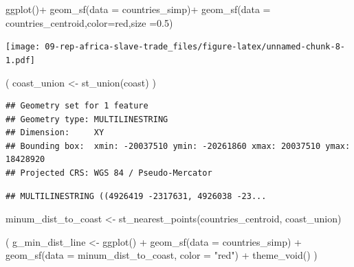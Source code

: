 \documentclass[
  oneside]{book}
\newenvironment{Shaded}{\begin{snugshade}}{\end{snugshade}}
\newcommand{\AttributeTok}[1]{\textcolor[rgb]{0.77,0.63,0.00}{#1}}
\newcommand{\FloatTok}[1]{\textcolor[rgb]{0.00,0.00,0.81}{#1}}
\newcommand{\FunctionTok}[1]{\textcolor[rgb]{0.00,0.00,0.00}{#1}}
\newcommand{\NormalTok}[1]{#1}
\newcommand{\OtherTok}[1]{\textcolor[rgb]{0.56,0.35,0.01}{#1}}
\newcommand{\SpecialCharTok}[1]{\textcolor[rgb]{0.00,0.00,0.00}{#1}}
\newcommand{\StringTok}[1]{\textcolor[rgb]{0.31,0.60,0.02}{#1}}
\begin{document}
\begin{Shaded}
\begin{Highlighting}[]
\FunctionTok{ggplot}\NormalTok{()}\SpecialCharTok{+}
  \FunctionTok{geom\_sf}\NormalTok{(}\AttributeTok{data =}\NormalTok{ countries\_simp)}\SpecialCharTok{+}
  \FunctionTok{geom\_sf}\NormalTok{(}\AttributeTok{data =}\NormalTok{ countries\_centroid,}\AttributeTok{color=}\StringTok{\textquotesingle{}red\textquotesingle{}}\NormalTok{,}\AttributeTok{size =}\FloatTok{0.5}\NormalTok{)}
\end{Highlighting}
\end{Shaded}

\texttt{[image: 09-rep-africa-slave-trade\_files/figure-latex/unnamed-chunk-8-1.pdf]}

\begin{Shaded}
\begin{Highlighting}[]
\NormalTok{(}
\NormalTok{  coast\_union }\OtherTok{\textless{}{-}} \FunctionTok{st\_union}\NormalTok{(coast)}
\NormalTok{)}
\end{Highlighting}
\end{Shaded}

\begin{verbatim}
## Geometry set for 1 feature 
## Geometry type: MULTILINESTRING
## Dimension:     XY
## Bounding box:  xmin: -20037510 ymin: -20261860 xmax: 20037510 ymax: 18428920
## Projected CRS: WGS 84 / Pseudo-Mercator
\end{verbatim}

\begin{verbatim}
## MULTILINESTRING ((4926419 -2317631, 4926038 -23...
\end{verbatim}

\begin{Shaded}
\begin{Highlighting}[]
\NormalTok{minum\_dist\_to\_coast }\OtherTok{\textless{}{-}} \FunctionTok{st\_nearest\_points}\NormalTok{(countries\_centroid, coast\_union)}
\end{Highlighting}
\end{Shaded}

\begin{Shaded}
\begin{Highlighting}[]
\NormalTok{(}
\NormalTok{  g\_min\_dist\_line }\OtherTok{\textless{}{-}}
    \FunctionTok{ggplot}\NormalTok{() }\SpecialCharTok{+}
    \FunctionTok{geom\_sf}\NormalTok{(}\AttributeTok{data =}\NormalTok{ countries\_simp) }\SpecialCharTok{+}
    \FunctionTok{geom\_sf}\NormalTok{(}\AttributeTok{data =}\NormalTok{ minum\_dist\_to\_coast, }\AttributeTok{color =} \StringTok{"red"}\NormalTok{) }\SpecialCharTok{+}
    \FunctionTok{theme\_void}\NormalTok{()}
\NormalTok{)}
\end{Highlighting}
\end{Shaded}
\end{document}

